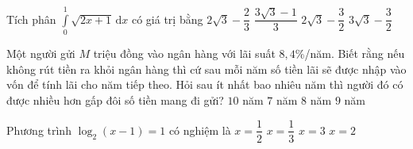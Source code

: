 \begin{ex}%
Tích phân $\displaystyle\int\limits_0^1 \sqrt{2x+1}\mathrm{\,d}x$ có giá trị bằng
\choice
{$2\sqrt{3}-\dfrac{2}{3}$}
{\True $\dfrac{3\sqrt{3}-1}{3}$}
{$2\sqrt{3}-\dfrac{3}{2}$}
{$3\sqrt{3}-\dfrac{3}{2}$}
\end{ex}
\begin{ex}%
Một người gửi $M$ triệu đồng vào ngân hàng với lãi suất $8{,}4\%$/năm. Biết rằng nếu
không rút tiền ra khỏi ngân hàng thì cứ sau mỗi năm số tiền lãi sẽ được nhập vào vốn để tính lãi cho năm tiếp theo. Hỏi sau ít nhất bao nhiêu năm thì người đó có được nhiều hơn gấp đôi số tiền mang đi gửi?
\choice
{$10$ năm}
{$7$ năm}
{$8$ năm}
{\True $9$ năm}
\end{ex}
\begin{ex}%
Phương trình $\log_2 {(x-1)}=1$ có nghiệm là
\choice
{$x=\dfrac{1}{2}$}
{$x=\dfrac{1}{3}$}
{\True $x=3$}
{$x=2$}
\end{ex}

